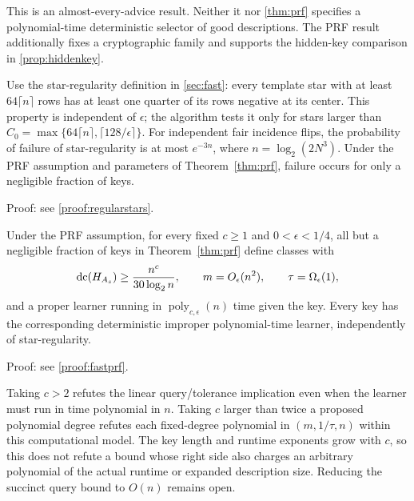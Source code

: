 This is an almost-every-advice result. Neither it nor \cref{thm:prf} specifies a polynomial-time deterministic selector of good descriptions. The PRF result additionally fixes a cryptographic family and supports the hidden-key comparison in \cref{prop:hiddenkey}.

\begin{lemma}\label{lem:regularstars}
Use the star-regularity definition in \cref{sec:fast}: every template star with at least $64\lceil n\rceil$ rows has at least one quarter of its rows negative at its center. This property is independent of $\epsilon$; the algorithm tests it only for stars larger than $C_0=\max\{64\lceil n\rceil,\lceil128/\epsilon\rceil\}$. For independent fair incidence flips, the probability of failure of star-regularity is at most $e^{-3n}$, where $n=\log_2(2N^3)$. Under the PRF assumption and parameters of Theorem~\ref{thm:prf}, failure occurs for only a negligible fraction of keys.
\end{lemma}

\noindent Proof: see \cref{proof:regularstars}.\par



\begin{corollary}\label{cor:fastprf}
Under the PRF assumption, for every fixed $c\ge1$ and $0<\epsilon<1/4$, all but a negligible fraction of keys in Theorem~\ref{thm:prf} define classes with
\[
 \operatorname{dc}(H_{A_s})\ge\frac{n^c}{30\log_2n},\qquad
 m=O_\epsilon(n^2),\qquad\tau=\Omega_\epsilon(1),
\]
and a proper learner running in $\operatorname{poly}_{c,\epsilon}(n)$ time given the key. Every key has the corresponding deterministic improper polynomial-time learner, independently of star-regularity.
\end{corollary}

\noindent Proof: see \cref{proof:fastprf}.\par


Taking $c>2$ refutes the linear query/tolerance implication even when the learner must run in time polynomial in $n$. Taking $c$ larger than twice a proposed polynomial degree refutes each fixed-degree polynomial in $(m,1/\tau,n)$ within this computational model. The key length and runtime exponents grow with $c$, so this does not refute a bound whose right side also charges an arbitrary polynomial of the actual runtime or expanded description size. Reducing the succinct query bound to $O(n)$ remains open.
